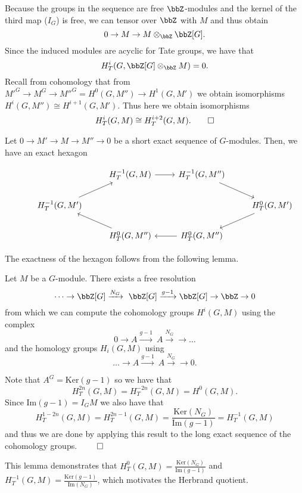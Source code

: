 \documentclass[a4paper, 12pt,oneside,openany]{book}
\begin{document}
Because the groups in the sequence are free $\bbZ$-modules and the kernel of the third map ($I_G$) is free, we can tensor over $\bbZ$ with $M$ and thus obtain $$0 \to M \to M \otimes_\bbZ \bbZ[G].$$ Since the induced modules are acyclic for Tate groups, we have that $$H_T^i(G, \bbZ[G] \otimes_\bbZ M) = 0.$$ Recall from cohomology that from ${M'}^G \to M^G \to {M''}^G = H^0(G, M'') \to H^1(G, M')$ we obtain isomorphisms $H^i(G, M'') \cong H^{i+1} (G, M').$ Thus here we obtain isomorphisms $$H^i_T(G, M) \cong H_T^{i+2}(G, M). \qed$$

Let $0 \to M' \to M \to M'' \to 0$ be a short exact sequence of $G$-modules. Then, we have an exact hexagon 

\[
\begin{tikzcd}
& &H_T^{-1}(G, M) \arrow{r} &H_T^{-1}(G, M'') \arrow{dr} & \\
&H_T^{-1}(G, M') \arrow{ur} & & &H_T^0(G, M') \arrow{dl} \\
& &H_T^0(G, M'') \arrow{ul} & H_T^0(G, M'') \arrow{l} &
\end{tikzcd}
\]

The exactness of the hexagon follows from the following lemma.


 Let $M$ be a $G$-module. There exists a free resolution $$\dots \to \bbZ[G] \xrightarrow{N_G}\ \bbZ[G] \xrightarrow{g-1} \bbZ[G] \to \bbZ \to 0$$ from which we can compute the cohomology groups $H^i(G, M)$ using the complex $$0 \to A \xrightarrow{g-1}\ A \xrightarrow{N_G} \to \dots$$ and the homology groups $H_i(G, M)$ using $$\dots \to  A \xrightarrow{g-1}\ A \xrightarrow{N_G} \to 0.$$

Note that $A^G = \text{Ker}(g-1)$ so we have that $$H^{2n}_T(G, M) = H^{-2n}_T(G, M) = H^0(G, M).$$ Since $\text{Im}(g-1) = I_GM$ we also have that $$H^{1-2n}_T(G, M) = H^{2n-1}_T(G, M) = \frac{\text{Ker}(N_G)}{\text{Im}(g-1)}=H^{-1}_T(G, M)$$ and thus we are done by applying this result to the long exact sequence of the cohomology groups. $\qed$

This lemma demonstrates that $H^0_T(G, M) = \frac{\text{Ker}(N_G)}{\text{Im}(g-1)}$  and $H_T^{-1}(G, M)=\frac{\text{Ker}(g-1)}{\text{Im}(N_G)}$, which motivates the Herbrand quotient.

\end{document}
